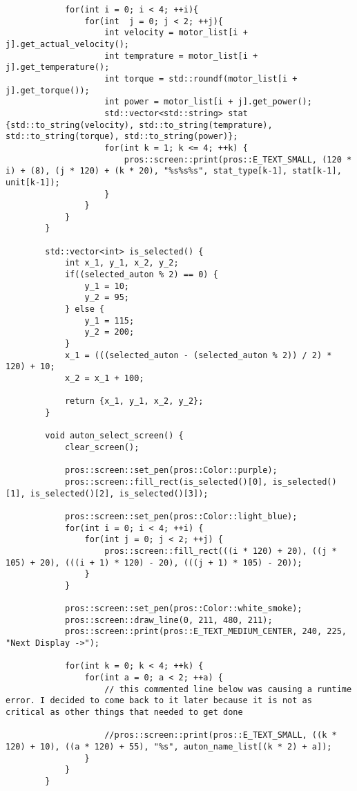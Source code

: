 \begin{verbatim}
            for(int i = 0; i < 4; ++i){
                for(int  j = 0; j < 2; ++j){
                    int velocity = motor_list[i + j].get_actual_velocity();
                    int temprature = motor_list[i + j].get_temperature();
                    int torque = std::roundf(motor_list[i + j].get_torque());
                    int power = motor_list[i + j].get_power();
                    std::vector<std::string> stat {std::to_string(velocity), std::to_string(temprature), std::to_string(torque), std::to_string(power)};
                    for(int k = 1; k <= 4; ++k) {
                        pros::screen::print(pros::E_TEXT_SMALL, (120 * i) + (8), (j * 120) + (k * 20), "%s%s%s", stat_type[k-1], stat[k-1], unit[k-1]);
                    }
                }
            }
        }

        std::vector<int> is_selected() {
            int x_1, y_1, x_2, y_2;
            if((selected_auton % 2) == 0) {
                y_1 = 10;
                y_2 = 95;
            } else {
                y_1 = 115;
                y_2 = 200;
            }
            x_1 = (((selected_auton - (selected_auton % 2)) / 2) * 120) + 10;
            x_2 = x_1 + 100;

            return {x_1, y_1, x_2, y_2};
        }

        void auton_select_screen() {
            clear_screen();
            
            pros::screen::set_pen(pros::Color::purple);
            pros::screen::fill_rect(is_selected()[0], is_selected()[1], is_selected()[2], is_selected()[3]);
            
            pros::screen::set_pen(pros::Color::light_blue);
            for(int i = 0; i < 4; ++i) {
                for(int j = 0; j < 2; ++j) {
                    pros::screen::fill_rect(((i * 120) + 20), ((j * 105) + 20), (((i + 1) * 120) - 20), (((j + 1) * 105) - 20));
                }
            }

            pros::screen::set_pen(pros::Color::white_smoke);
            pros::screen::draw_line(0, 211, 480, 211);
            pros::screen::print(pros::E_TEXT_MEDIUM_CENTER, 240, 225, "Next Display ->");

            for(int k = 0; k < 4; ++k) {
                for(int a = 0; a < 2; ++a) {
                    // this commented line below was causing a runtime error. I decided to come back to it later because it is not as critical as other things that needed to get done

                    //pros::screen::print(pros::E_TEXT_SMALL, ((k * 120) + 10), ((a * 120) + 55), "%s", auton_name_list[(k * 2) + a]);
                }
            }
        }


\end{verbatim}
